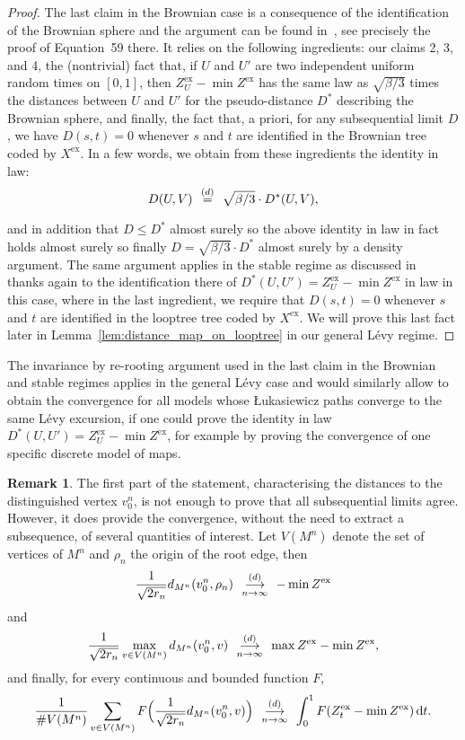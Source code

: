 \documentclass[british, a4paper,11pt]{article}
\numberwithin{equation}{section}
\theoremstyle{definition}
\newtheorem{rem}[thm]{Remark}
\renewcommand{\d}{\mathop{}\!\mathrm{d}}
\newcommand{\cvloi}[1][n]{\enskip\mathop{\longrightarrow}^{(d)}_{#1 \to \infty}\enskip}
\newcommand{\eqloi}[1][n]{\enskip\mathop{=}^{(d)}_{}\enskip}
\newcommand{\exc}{\mathrm{ex}}
\begin{document}
\begin{proof}
The last claim in the Brownian case is a consequence of the identification of the Brownian sphere and the argument can be found in~\cite{LG13}, see precisely the proof of Equation~59 there.
It relies on the following ingredients: our claims 2, 3, and 4, the (nontrivial) fact that, if $U$ and $U'$ are two independent uniform random times on $[0,1]$, then $Z^{\exc}_U - \min Z^{\exc}$ has the same law as $\sqrt{\beta/3}$ times the distances between $U$ and $U'$ for the pseudo-distance $D^\ast$ describing the Brownian sphere, and finally, the fact that, a priori, for any subsequential limit $D$, we have $D(s,t)=0$ whenever $s$ and $t$ are identified in the Brownian tree coded by $X^{\exc}$.
In a few words, we obtain from these ingredients
the identity in law:
\[D(U,V) \eqloi \sqrt{\beta/3}\cdot D^\ast(U, V),\]
and in addition that 
$D \le D^\ast$ almost surely so the above identity in law in fact holds almost surely so finally $D=\sqrt{\beta/3} \cdot D^\ast$ almost surely by a density argument.
The same argument applies in the stable regime as discussed in~\cite[Section~7.4.2]{CMR25} thanks again to the identification there of $D^\ast(U,U')=Z^{\exc}_U - \min Z^{\exc}$ in law in this case, where in the last ingredient, we require that $D(s,t)=0$ whenever $s$ and $t$ are identified in the looptree tree coded by $X^{\exc}$.
We will prove this last fact later in Lemma~\ref{lem:distance_map_on_looptree} in our general L\'evy regime.
\end{proof}


The  invariance by re-rooting argument used in the last claim in the Brownian and stable regimes applies in the general L\'evy case and would similarly allow to obtain the convergence for all models whose {\L}ukasiewicz paths converge to the same L\'evy excursion, 
if one could prove 
the identity in law $D^\ast(U,U')=Z^{\exc}_U - \min Z^{\exc}$,
for example by proving the convergence of one specific discrete model of maps.


\begin{rem}
The first part of the statement, characterising the distances to the distinguished vertex $v^n_0$, is not enough to prove that all subsequential limits agree.
However, it does provide the convergence, without the need to extract a subsequence, of several quantities of interest.
Let $V(M^n)$ denote the set of vertices of $M^n$ and $\rho_n$ the origin of the root edge, then 
\[\frac{1}{\sqrt{2 r_n}} d_{M^n}(v^n_0, \rho_n) \cvloi - \min Z^{\exc}\]
and
\[
\frac{1}{\sqrt{2 r_n}} \max_{v \in V(M^n)} d_{M^n}(v^n_0, v) \cvloi \max Z^{\exc} - \min Z^{\exc},\]
and finally, for every continuous and bounded function $F$, 
\[\frac{1}{\#V(M^n)} \sum_{v \in V(M^n)} F\Bigl(\frac{1}{\sqrt{2 r_n}} d_{M^n}(v^n_0, v)\Bigr) \cvloi \int_0^1 F(Z^{\exc}_t - \min Z^{\exc}) \d t.\]
\end{rem}
\end{document}
